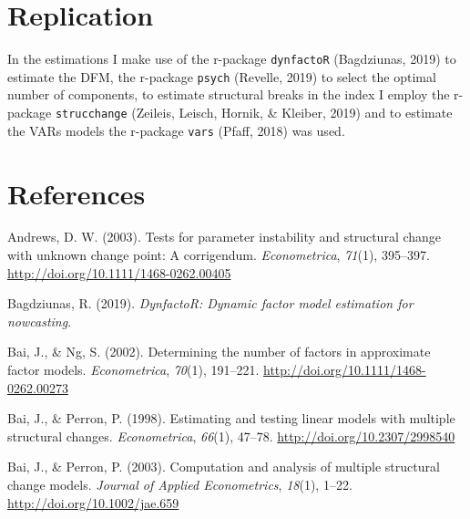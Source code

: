 \documentclass[12pt,twoside]{reedthesis}
\begin{document}
\appendix

\hypertarget{replication}{%
\chapter{Replication}\label{replication}}

In the estimations I make use of the r-package \texttt{dynfactoR} (Bagdziunas, 2019) to estimate the DFM, the r-package \texttt{psych} (Revelle, 2019) to select the optimal number of components, to estimate structural breaks in the index I employ the r-package \texttt{strucchange} (Zeileis, Leisch, Hornik, \& Kleiber, 2019) and to estimate the VARs models the r-package \texttt{vars} (Pfaff, 2018) was used.

\backmatter

\hypertarget{references}{%
\chapter*{References}\label{references}}


\noindent

\setlength{\parindent}{-0.20in}
\setlength{\leftskip}{0.20in}
\setlength{\parskip}{8pt}

\hypertarget{refs}{}
\leavevmode\hypertarget{ref-andrews:2003}{}%
Andrews, D. W. (2003). Tests for parameter instability and structural change with unknown change point: A corrigendum. \emph{Econometrica}, \emph{71}(1), 395--397. \url{http://doi.org/10.1111/1468-0262.00405}

\leavevmode\hypertarget{ref-R-dynfactoR}{}%
Bagdziunas, R. (2019). \emph{DynfactoR: Dynamic factor model estimation for nowcasting}.

\leavevmode\hypertarget{ref-baing:2002}{}%
Bai, J., \& Ng, S. (2002). Determining the number of factors in approximate factor models. \emph{Econometrica}, \emph{70}(1), 191--221. \url{http://doi.org/10.1111/1468-0262.00273}

\leavevmode\hypertarget{ref-baiperr:1998}{}%
Bai, J., \& Perron, P. (1998). Estimating and testing linear models with multiple structural changes. \emph{Econometrica}, \emph{66}(1), 47--78. \url{http://doi.org/10.2307/2998540}

\leavevmode\hypertarget{ref-baiperr:2003}{}%
Bai, J., \& Perron, P. (2003). Computation and analysis of multiple structural change models. \emph{Journal of Applied Econometrics}, \emph{18}(1), 1--22. \url{http://doi.org/10.1002/jae.659}
\end{document}
